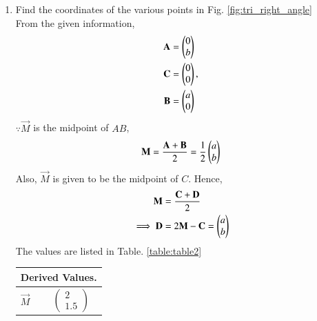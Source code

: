 \begin{enumerate}[label=\thesection.\arabic*.,ref=\thesection.\theenumi]
%
\item Find the coordinates of the various points in Fig. \ref{fig:tri_right_angle}
\label{const:tri_right_angle}
\\
%
\solution From the given information, 
\begin{align}
\label{eq:constr_a}
\mathbf{A} &= \begin{pmatrix}0\\b\end{pmatrix} 
\\
 \mathbf{C} &= \begin{pmatrix}0\\0\end{pmatrix}, 
\label{eq:constr_c}
\\
\mathbf{B} &= \begin{pmatrix}a\\0\end{pmatrix}
\label{eq:constr_b}
\end{align}
$\because \vec{M}$ is the midpoint of $AB$,
\begin{align}
\mathbf{M}= \frac{\mathbf{A}+\mathbf{B}}{2} = \frac{1}{2}\begin{pmatrix}a\\b\end{pmatrix}
\label{eq:constr_m}
\end{align}
%
Also, $\vec{M}$ is given to be the midpoint of $C$.  Hence, 
\begin{align}
\mathbf{M}&= \frac{\mathbf{C}+\mathbf{D}}{2}
\\
\implies \mathbf{D} &= 2 \mathbf{M} - \mathbf{C} = \begin{pmatrix}a\\b\end{pmatrix}
\label{eq:constr_d}
\end{align}
%
The values are listed in 
Table. \ref{table:table2} 
\begin{table}[ht!]
\centering
\begin{tabular}{ |p{3cm}|p{3cm}|  }
\hline
 \multicolumn{2}{|c|}{Derived Values.} \\
\hline
$\vec{M}$ & $$\begin{pmatrix}2\\1.5\end{pmatrix}$$\\						

\end{tabular}
\end{table}
\end{enumerate}
